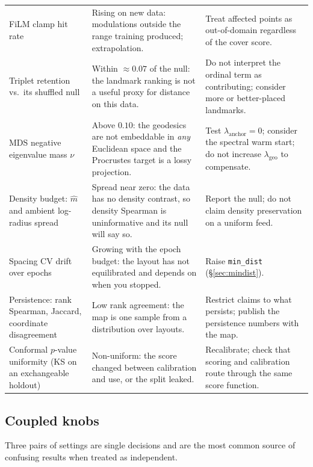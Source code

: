 \documentclass[12pt]{iopart}
\theoremstyle{definition}
\theoremstyle{plain}
\theoremstyle{remark}
\newcommand{\code}[1]{\texttt{#1}}
\begin{document}
\begin{table}[htbp]
\begin{tabular}{p{}p{}p{}}
FiLM clamp hit rate
& Rising on new data: modulations outside the range training produced;
extrapolation.
& Treat affected points as out-of-domain regardless of the cover score. \\[2pt]

Triplet retention vs.\ its shuffled null
& Within $\approx0.07$ of the null: the landmark ranking is not a useful
proxy for distance on this data.
& Do not interpret the ordinal term as contributing; consider more or
better-placed landmarks. \\[2pt]

MDS negative eigenvalue mass $\nu$
& Above $0.10$: the geodesics are not embeddable in \emph{any} Euclidean
space and the Procrustes target is a lossy projection.
& Test $\lambda_{\mathrm{anchor}}=0$; consider the spectral warm start; do
not increase $\lambda_{\mathrm{geo}}$ to compensate. \\[2pt]

Density budget: $\hat m$ and ambient log-radius spread
& Spread near zero: the data has no density contrast, so density Spearman
is uninformative and its null will say so.
& Report the null; do not claim density preservation on a uniform feed. \\[2pt]

Spacing CV drift over epochs
& Growing with the epoch budget: the layout has not equilibrated and depends
on when you stopped.
& Raise \code{min\_dist} (\S\ref{sec:mindist}). \\[2pt]

Persistence: rank Spearman, Jaccard, coordinate disagreement
& Low rank agreement: the map is one sample from a distribution over
layouts.
& Restrict claims to what persists; publish the persistence numbers with
the map. \\[2pt]

Conformal $p$-value uniformity (KS on an exchangeable holdout)
& Non-uniform: the score changed between calibration and use, or the split
leaked.
& Recalibrate; check that scoring and calibration route through the same
score function. \\
\bottomrule
\end{tabular}
\end{table}

\subsection{Coupled knobs}
\label{sec:defaults}

Three pairs of settings are single decisions and are the most common source of
confusing results when treated as independent.
\end{document}
